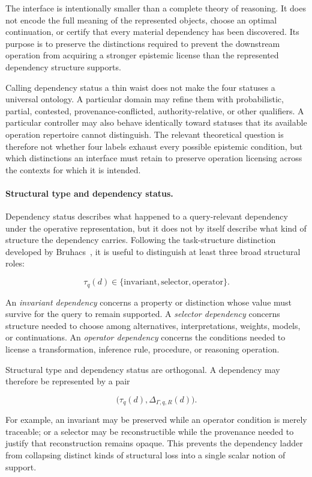 \documentclass[11pt]{article}
\theoremstyle{definition}
\theoremstyle{remark}
\begin{document}
The interface is intentionally smaller than a complete theory of reasoning. It does not encode the full meaning of the represented objects, choose an optimal continuation, or certify that every material dependency has been discovered. Its purpose is to preserve the distinctions required to prevent the downstream operation from acquiring a stronger epistemic license than the represented dependency structure supports.

Calling dependency status a thin waist does not make the four statuses a universal ontology. A particular domain may refine them with probabilistic, partial, contested, provenance-conflicted, authority-relative, or other qualifiers. A particular controller may also behave identically toward statuses that its available operation repertoire cannot distinguish. The relevant theoretical question is therefore not whether four labels exhaust every possible epistemic condition, but which distinctions an interface must retain to preserve operation licensing across the contexts for which it is intended.

\paragraph{Structural type and dependency status.}
Dependency status describes what happened to a query-relevant dependency under the operative representation, but it does not by itself describe what kind of structure the dependency carries. Following the task-structure distinction developed by Bruhacs~\cite{Bruhacs2026Projection}, it is useful to distinguish at least three broad structural roles:

\[
\tau_q(d)\in
\{\text{invariant},\text{selector},\text{operator}\}.
\]

An \emph{invariant dependency} concerns a property or distinction whose value must survive for the query to remain supported. A \emph{selector dependency} concerns structure needed to choose among alternatives, interpretations, weights, models, or continuations. An \emph{operator dependency} concerns the conditions needed to license a transformation, inference rule, procedure, or reasoning operation.

Structural type and dependency status are orthogonal. A dependency may therefore be represented by a pair

\[
\bigl(\tau_q(d),\Delta_{\Gamma,q,R}(d)\bigr).
\]

For example, an invariant may be preserved while an operator condition is merely traceable; or a selector may be reconstructible while the provenance needed to justify that reconstruction remains opaque. This prevents the dependency ladder from collapsing distinct kinds of structural loss into a single scalar notion of support.
\end{document}
